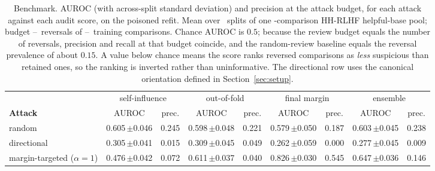 \begin{table}[t]
\caption{Benchmark. AUROC (with across-split standard deviation) and
precision at the attack budget, for each attack against each audit score, on the
poisoned refit. Mean over \vNSeeds\ splits of one \vNPool-comparison HH-RLHF
helpful-base pool; budget \vBudgetMin--\vBudgetMax\ reversals of
\vNTrainMin--\vNTrainMax\ training comparisons. Chance AUROC is $0.5$; because
the review budget equals the number of reversals, precision and recall at that
budget coincide, and the random-review baseline equals the reversal prevalence
of about $0.15$. A value below chance means the score ranks reversed
comparisons as \emph{less} suspicious than retained ones, so the ranking is
inverted rather than uninformative. The directional row uses the canonical
orientation defined in Section~\ref{sec:setup}.}
\label{tab:e1}
\centering
\footnotesize
\begin{tabular}{@{}l cc cc cc cc@{}}
\toprule
& \multicolumn{2}{c}{self-influence} & \multicolumn{2}{c}{out-of-fold}
& \multicolumn{2}{c}{final margin} & \multicolumn{2}{c}{ensemble} \\
\cmidrule(lr){2-3}\cmidrule(lr){4-5}\cmidrule(lr){6-7}\cmidrule(lr){8-9}
\textbf{Attack} & AUROC & prec. & AUROC & prec. & AUROC & prec. & AUROC & prec. \\
\midrule
random & 0.605\,$\pm$0.046 & 0.245 & 0.598\,$\pm$0.048 & 0.221 & 0.579\,$\pm$0.050 & 0.187 & 0.603\,$\pm$0.045 & 0.238 \\
directional & 0.305\,$\pm$0.041 & 0.015 & 0.309\,$\pm$0.045 & 0.049 & 0.262\,$\pm$0.059 & 0.000 & 0.277\,$\pm$0.045 & 0.009 \\
margin-targeted ($\alpha{=}1$) & 0.476\,$\pm$0.042 & 0.072 & 0.611\,$\pm$0.037 & 0.040 & 0.826\,$\pm$0.030 & 0.545 & 0.647\,$\pm$0.036 & 0.146 \\
\bottomrule
\end{tabular}
\end{table}
